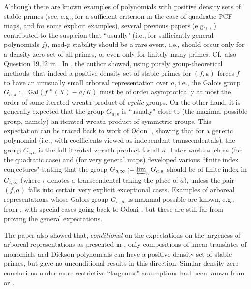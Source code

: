 \documentclass[a4paper]{amsart}
\begin{document}
  Although there are known examples of polynomials with positive density sets of stable primes (see, e.g., \cite[Theorem 6.1(2)]{Jones} for a sufficient criterion in the case of quadratic PCF maps, and \cite[Section 1]{MOS} for some explicit examples), several  previous papers (e.g., \cite{Ferr}, \cite{KNR}) contributed to the suspicion that ``usually" (i.e., for sufficiently general polynomials $f$), mod-$p$ stability should be a rare event, i.e., should occur only for a density zero set of all primes, or even only for finitely many primes. Cf.\ also Question 19.12 in \cite{Survey}.
  In \cite{Koe24}, the author showed, using purely group-theoretical methods, that indeed a positive density set of stable primes for $(f,a)$ forces $f$ to have an unusually small arboreal representation over $a$, i.e., the Galois group $G_{a,n}:=\textrm{Gal}(f^{\circ n}(X)-a/K)$ must be of order asymptotically at most the order of some iterated wreath product of {\it cyclic} groups. On the other hand, it is generally expected that the group $G_{a,n}$ is ``usually" close to (the maximal possible group, namely) an iterated wreath product of symmetric groups. This expectation can be traced back to work of Odoni \cite{Odoni2}, showing that for a generic polynomial (i.e., with coefficients viewed as independent transcendentals), the group $G_{a,n}$ is the full iterated wreath product for all $n$. 
 Later works such as \cite{Jones2} (for the quadratic case) and \cite{BDGHT} (for very general maps) developed various ``finite index conjectures" stating that the group $G_{a,\infty}:=\varprojlim_n G_{a,n}$ should be of finite index in $G_{t,\infty}$ (where $t$ denotes a transcendental taking the place of $a$), unless the pair $(f,a)$ falls into certain very explicit exceptional cases.
    Examples of arboreal representations whose Galois group $G_{a,\infty}$ is maximal possible are known, e.g., from \cite{Kadets}, with special cases going back to Odoni \cite{Odoni}, but these are still far from proving the general expectations.

   The paper \cite{Koe24} also showed
  that, {\it conditional} on the expectations on the largeness of arboreal representations as presented in \cite{BDGHT}, only compositions of linear translates of monomials and Dickson polynomials can have a positive density set of stable primes, but gave no unconditional results in this direction.
  Similar density zero conclusions under more restrictive ``largeness" assumptions 
  had been known from \cite{Ferr} or \cite{KNR}. 
    
\end{document}

